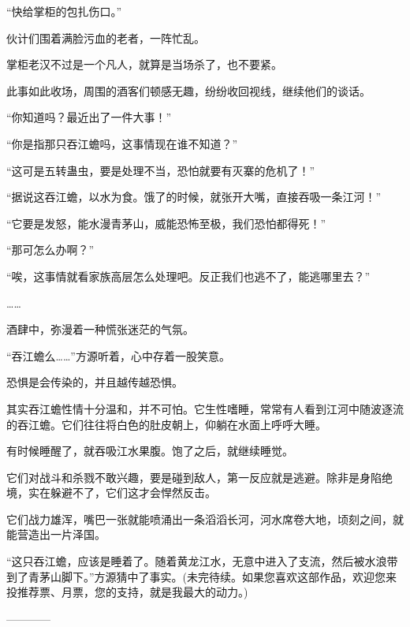 \begin{this_body}
“快给掌柜的包扎伤口。”

伙计们围着满脸污血的老者，一阵忙乱。

掌柜老汉不过是一个凡人，就算是当场杀了，也不要紧。

此事如此收场，周围的酒客们顿感无趣，纷纷收回视线，继续他们的谈话。

“你知道吗？最近出了一件大事！”

“你是指那只吞江蟾吗，这事情现在谁不知道？”

“这可是五转蛊虫，要是处理不当，恐怕就要有灭寨的危机了！”

“据说这吞江蟾，以水为食。饿了的时候，就张开大嘴，直接吞吸一条江河！”

“它要是发怒，能水漫青茅山，威能恐怖至极，我们恐怕都得死！”

“那可怎么办啊？”

“唉，这事情就看家族高层怎么处理吧。反正我们也逃不了，能逃哪里去？”

……

酒肆中，弥漫着一种慌张迷茫的气氛。

“吞江蟾么……”方源听着，心中存着一股笑意。

恐惧是会传染的，并且越传越恐惧。

其实吞江蟾性情十分温和，并不可怕。它生性嗜睡，常常有人看到江河中随波逐流的吞江蟾。它们往往将白色的肚皮朝上，仰躺在水面上呼呼大睡。

有时候睡醒了，就吞吸江水果腹。饱了之后，就继续睡觉。

它们对战斗和杀戮不敢兴趣，要是碰到敌人，第一反应就是逃避。除非是身陷绝境，实在躲避不了，它们这才会悍然反击。

它们战力雄浑，嘴巴一张就能喷涌出一条滔滔长河，河水席卷大地，顷刻之间，就能营造出一片泽国。

“这只吞江蟾，应该是睡着了。随着黄龙江水，无意中进入了支流，然后被水浪带到了青茅山脚下。”方源猜中了事实。(未完待续。如果您喜欢这部作品，欢迎您来投推荐票、月票，您的支持，就是我最大的动力。)

------------

\end{this_body}


